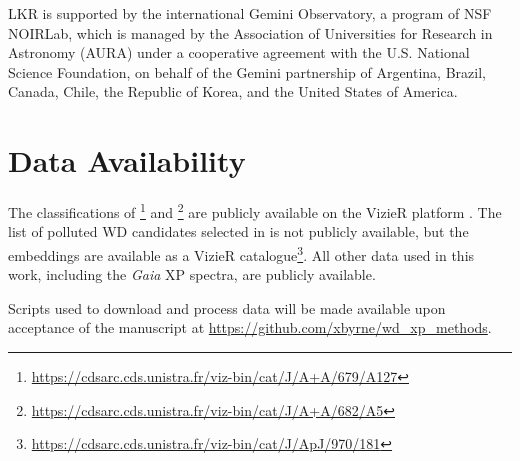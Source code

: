 \documentclass[fleqn,usenatbib]{rasti}
\begin{document}
LKR is supported by the international Gemini Observatory, a program of NSF NOIRLab, which is managed by the Association of Universities for Research in Astronomy (AURA) under a cooperative agreement with the U.S. National Science Foundation, on behalf of the Gemini partnership of Argentina, Brazil, Canada, Chile, the Republic of Korea, and the United States of America.

\section*{Data Availability}

The classifications of \citet{garciazamora23}\footnote{
    \url{https://cdsarc.cds.unistra.fr/viz-bin/cat/J/A+A/679/A127}
} and \citet{vincent24}\footnote{
    \url{https://cdsarc.cds.unistra.fr/viz-bin/cat/J/A+A/682/A5}
} are publicly available on the VizieR platform \citep{ochsenbein00}.
The list of polluted WD candidates selected in \citet{kao24} is not publicly available, but the embeddings are available as a VizieR catalogue\footnote{
    \url{https://cdsarc.cds.unistra.fr/viz-bin/cat/J/ApJ/970/181}
}.
All other data used in this work, including the \textit{Gaia} XP spectra, are publicly available.

Scripts used to download and process data will be made available upon acceptance of the manuscript at
\url{https://github.com/xbyrne/wd_xp_methods}.








\appendix




\bsp	%
\label{lastpage}
\end{document}
